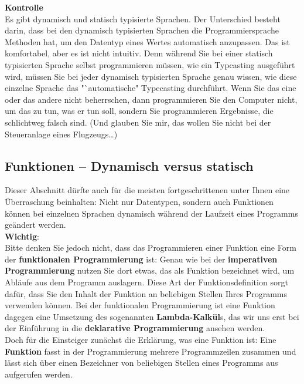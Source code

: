 \textbf{Kontrolle}\\
Es gibt dynamisch und statisch typisierte Sprachen. Der Unterschied besteht darin, dass bei den dynamisch typisierten Sprachen die Programmiersprache Methoden hat, um den Datentyp eines Wertes automatisch anzupassen. Das ist komfortabel, aber es ist nicht intuitiv. Denn während Sie bei einer statisch typisierten Sprache selbst programmieren müssen, wie ein Typcasting ausgeführt wird, müssen Sie bei jeder dynamisch typisierten Sprache genau wissen, wie diese einzelne Sprache das "`automatische" Typecasting durchführt. Wenn Sie das eine oder das andere nicht beherrschen, dann programmieren Sie den Computer nicht, um das zu tun, was er tun soll, sondern Sie programmieren Ergebnisse, die schlichtweg falsch sind. (Und glauben Sie mir, das wollen Sie nicht bei der Steueranlage eines Flugzeugs…)

\subsection{Funktionen – Dynamisch versus statisch}
Dieser Abschnitt dürfte auch für die meisten fortgeschrittenen unter Ihnen eine Überraschung beinhalten: Nicht nur Datentypen, sondern auch Funktionen können bei einzelnen Sprachen dynamisch während der Laufzeit eines Programms geändert werden.\\

\textbf{Wichtig}:\\
Bitte denken Sie jedoch nicht, dass das Programmieren einer Funktion eine Form der \textbf{funktionalen Programmierung} ist: Genau wie bei der \textbf{imperativen Programmierung} nutzen Sie dort etwas, das als Funktion bezeichnet wird, um Abläufe aus dem Programm auslagern. Diese Art der Funktionsdefinition sorgt dafür, dass Sie den Inhalt der Funktion an beliebigen Stellen Ihres Programms verwenden können. Bei der funktionalen Programmierung ist eine Funktion dagegen eine Umsetzung des sogenannten \textbf{Lambda-Kalkül}s, das wir uns erst bei der Einführung in die \textbf{deklarative Programmierung} ansehen werden.\\

Doch für die Einsteiger zunächst die Erklärung, was eine Funktion ist: Eine \textbf{Funktion} fasst in der Programmierung mehrere Programmzeilen zusammen und lässt sich über einen Bezeichner von beliebigen Stellen eines Programms aus aufgerufen werden.\\

